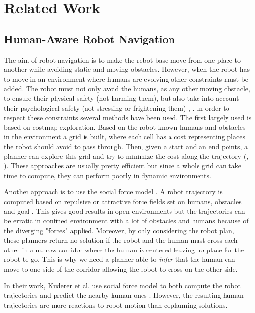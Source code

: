 \documentclass[a4paper,11pt,twoside]{StyleThese}
\begin{document}
\section{Related Work}
\subsection{Human-Aware Robot Navigation}
The aim of robot navigation is to make the robot base move from one place to another while avoiding static and moving obstacles. However, when the robot has to move in an environment where humans are evolving other constraints must be added. The robot must not only avoid the humans, as any other moving obstacle, to ensure their physical safety (not harming them), but also take into account their psychological safety (not stressing or frightening them) \cite{sisbot_human_2007}, \cite{kruse_human-aware_2013}. In order to respect these constraints several methods have been used. The first largely used is based on costmap exploration. Based on the robot known humans and obstacles in the environment a grid is built, where each cell has a cost representing places the robot should avoid to pass through. Then, given a start and an end points, a planner can explore this grid and try to minimize the cost along the trajectory (\cite{sisbot_human_2007}, \cite{lu_towards_2013}). These approaches are usually pretty efficient but since a whole grid can take time to compute, they can perform poorly in dynamic environments.

Another approach is to use the social force model \cite{helbing_social_1995}. A robot trajectory is computed based on repulsive or attractive force fields set on humans, obstacles and goal \cite{ferrer_robot_2013}. This gives good results in open environments but the trajectories can be erratic in confined environment with a lot of obstacles and humans because of the diverging "forces" applied. Moreover, by only considering the robot plan, these planners return no solution if the robot and the human must cross each other in a narrow corridor where the human is centered leaving no place for the robot to go. This is why we need a planner able to \textit{infer} that the human can move to one side of the corridor allowing the robot to cross on the other side.

In their work, Kuderer et al. use social force model to both compute the robot trajectories and predict the nearby human ones \cite{kuderer_feature-based_2012}. However, the resulting human trajectories are more reactions to robot motion than coplanning solutions.
\end{document}
